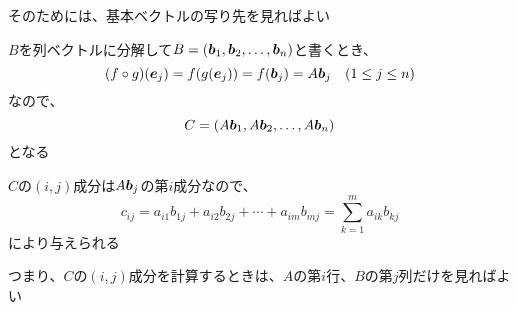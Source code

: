 \documentclass[../../../topic_linear-algebra]{subfiles}
\begin{document}
そのためには、基本ベクトルの写り先を見ればよい

\br

$B$を列ベクトルに分解して$B = (\vb*{b}_1, \vb*{b}_2, \dots, \vb*{b}_n)$と書くとき、
\begin{equation*}
  (f \circ g)(\vb*{e}_j) = f(g(\vb*{e}_j)) = f(\vb*{b}_j) = A \vb*{b}_j \quad (1 \leq j \leq n)
\end{equation*}
なので、
\begin{equation*}
  C = (A\vb*{b}_1, A\vb*{b}_2, \dots, A\vb*{b}_n)
\end{equation*}
となる

$C$の$(i, j)$成分は$A\vb*{b}_j$の第$i$成分なので、
\begin{equation*}
  c_{ij} = a_{i1} b_{1j} + a_{i2} b_{2j} + \cdots + a_{im} b_{mj} = \sum_{k=1}^m a_{ik} b_{kj}
\end{equation*}
により与えられる

つまり、$C$の$(i, j)$成分を計算するときは、$A$の第$i$行、$B$の第$j$列だけを見ればよい
\end{document}
